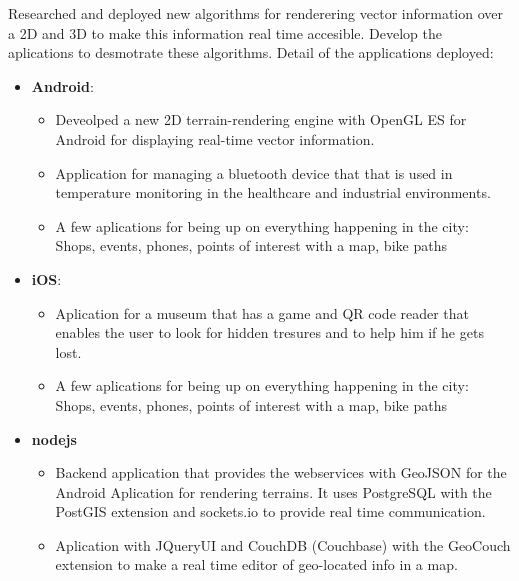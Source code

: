 \documentclass[11pt,a4paper,sans]{moderncv}
\begin{document}
%
%
{Researched and deployed new algorithms for renderering vector information over a 2D and 3D to make this information real time accesible. Develop the aplications to desmotrate these algorithms.
\newline{}\newline{}
Detail of the applications deployed:
\begin{itemize}
	\item \textbf{Android}:
		\begin{itemize}
			\item Deveolped a new 2D terrain-rendering engine with OpenGL ES for Android for displaying real-time vector information.
			\item Application for managing a bluetooth device that that is used in temperature monitoring in the healthcare and industrial environments.
			\item A few aplications for being up on everything happening in the city: Shops, events, phones, points of interest with a map, bike paths
		\end{itemize}
	\item \textbf{iOS}:
		\begin{itemize}
			\item Aplication for a museum that has a game and QR code reader that enables the user to look for hidden tresures and to help him if he gets lost.
			\item A few aplications for being up on everything happening in the city: Shops, events, phones, points of interest with a map, bike paths
		\end{itemize}
	\item \textbf{nodejs}
		\begin{itemize}
			\item Backend application that provides the webservices with GeoJSON for the Android Aplication for rendering terrains. It uses PostgreSQL with the PostGIS extension and sockets.io to provide real time communication.
			\item Aplication with JQueryUI and CouchDB (Couchbase) with the GeoCouch extension to make a real time editor of geo-located info in a map.
		\end{itemize}
\end{itemize}}

\end{document}
